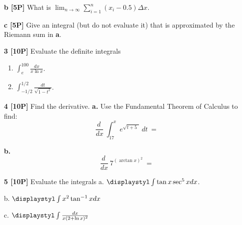 \documentclass[12pt]{article}
\begin{document}
{\bf b [5P]} What is ${\displaystyle
\lim_{n\to \infty}
\sum_{i=1}^n \left(x_i -0.5\right)\Delta x}$.

{\bf c [5P]} Give an integral 
(but do not evaluate it) that is approximated by the Riemann sum in {\bf a}.

\vspace{.5in}



{\bf 3 [10P]} Evaluate the definite integrals
\begin{enumerate}
\item[a.] \;${\displaystyle \int_e^{100} \frac{dx}{ x\ln x} }$.
\item[b.] \;${\displaystyle \int^{1/2}_{-1/2} \frac{dt}{\sqrt{1-t^2}} }$.
\end{enumerate}


{\bf 4 [10P]} Find the derivative. 
{\bf a.} Use the Fundamental Theorem of Calculus to find:
\begin{equation*} 
\frac{d\ }{dx} ~ 
\int_{17}^x e^{\sqrt{t+5~~}} \, dt~ = ~
\end{equation*}

{\bf b.}
\begin{equation*} 
\frac{d\ }{dx} ~ 
7^{(\arctan x)^2} ~=~
\end{equation*}

{\bf 5 [10P]} Evaluate the integrals \quad
a. ${\displaystyl \int \tan x \sec^5 x dx}$.


b. ${\displaystyl \int x^2 \tan^{-1} x dx}$



c. ${\displaystyl \int \frac{dx}{ x(2+\ln x)^2} } $
\end{document}
